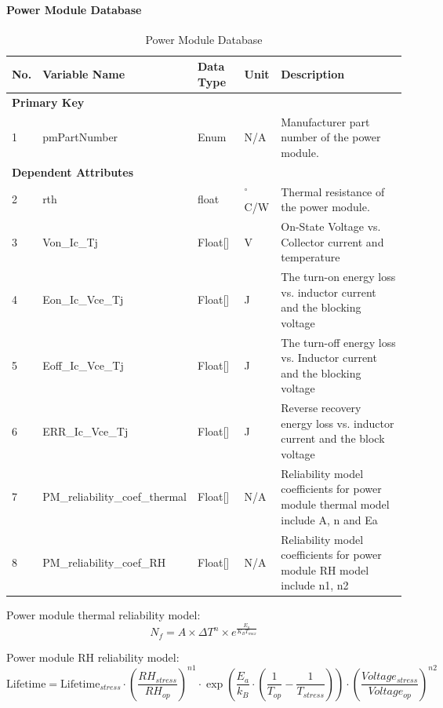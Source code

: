 \documentclass{article}
\begin{document}
\paragraph{Power Module Database}
\begin{table}[h]
\centering
\caption{Power Module Database}
\begin{tabular}{|l|l|l|l|p{6cm}|}
\hline
\textbf{No.} & \textbf{Variable Name} & \textbf{Data Type} & \textbf{Unit} & \textbf{Description} \\ \hline
\multicolumn{5}{|l|}{\textbf{Primary Key}} \\ \hline
1 & pmPartNumber & Enum & N/A & Manufacturer part number of the power module. \\ \hline
\multicolumn{5}{|l|}{\textbf{Dependent Attributes}} \\ \hline
2 & rth & float & $^\circ$C/W & Thermal resistance of the power module. \\ \hline
3 & Von\_Ic\_Tj & Float[] & V & On-State Voltage vs. Collector current and temperature \\ \hline
4 & Eon\_Ic\_Vce\_Tj & Float[] & J & The turn-on energy loss vs. inductor current and the blocking voltage \\ \hline
5 & Eoff\_Ic\_Vce\_Tj & Float[] & J & The turn-off energy loss vs. Inductor current and the blocking voltage \\ \hline
6 & ERR\_Ic\_Vce\_Tj & Float[] & J & Reverse recovery energy loss vs. inductor current and the block voltage \\ \hline
7 & PM\_reliability\_coef\_thermal & Float[] & N/A & Reliability model coefficients for power module thermal model include A, n and Ea \\ \hline
8 & PM\_reliability\_coef\_RH & Float[] & N/A & Reliability model coefficients for power module RH model include n1, n2 \\ \hline
\end{tabular}
\end{table}

Power module thermal reliability model:
\begin{equation}
N_f = A \times \Delta T^n \times e^{\frac{E_a}{K_B T_{max}}}
\end{equation}

Power module RH reliability model:
\begin{equation}
\text{Lifetime} = \text{Lifetime}_{stress} \cdot \left(\frac{RH_{stress}}{RH_{op}}\right)^{n1} \cdot \exp\left(\frac{E_a}{k_B} \cdot \left(\frac{1}{T_{op}} - \frac{1}{T_{stress}}\right)\right) \cdot \left(\frac{Voltage_{stress}}{Voltage_{op}}\right)^{n2}
\end{equation}
\end{document}
